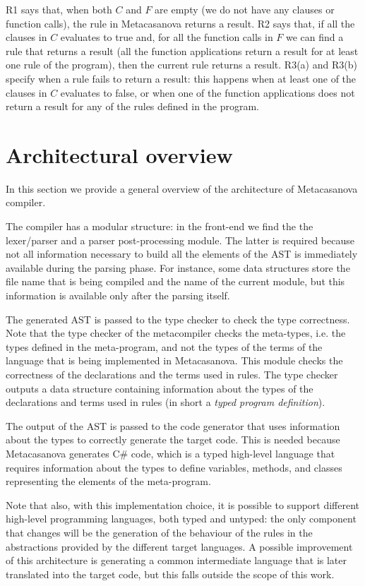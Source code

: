 R1 says that, when both $C$ and $F$ are empty (we do not have any clauses or function calls), the rule in Metacasanova returns a result. R2 says that, if all the clauses in $C$ evaluates to true and, for all the function calls in $F$ we can find a rule that returns a result (all the function applications return a result for at least one rule of the program), then the current rule returns a result. R3(a) and R3(b) specify when a rule fails to return a result: this happens when at least one of the clauses in $C$ evaluates to false, or when one of the function applications does not return a result for any of the rules defined in the program.

\section{Architectural overview}
\label{sec:ch_metacasanova_architecture}
In this section we provide a general overview of the architecture of Metacasanova compiler.

The compiler has a modular structure: in the front-end we find the the lexer/parser and a parser post-processing module. The latter is required because not all information necessary to build all the elements of the AST is immediately available during the parsing phase. For instance, some data structures store the file name that is being compiled and the name of the current module, but this information is available only after the parsing itself. 

The generated AST is passed to the type checker to check the type correctness. Note that the type checker of the metacompiler checks the meta-types, i.e. the types defined in the meta-program, and not the types of the terms of the language that is being implemented in Metacasanova. This module checks the correctness of the declarations and the terms used in rules. The type checker outputs a data structure containing information about the types of the declarations and terms used in rules (in short a \textit{typed program definition}).

The output of the AST is passed to the code generator that uses information about the types to correctly generate the target code. This is needed because Metacasanova generates C\# code, which is a typed high-level language that requires information about the types to define variables, methods, and classes representing the elements of the meta-program.

Note that also, with this implementation choice, it is possible to support different high-level programming languages, both typed and untyped: the only component that changes will be the generation of the behaviour of the rules in the abstractions provided by the different target languages. A possible improvement of this architecture is generating a common intermediate language that is later translated into the target code, but this falls outside the scope of this work.


